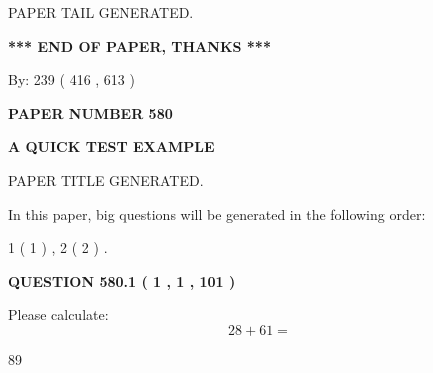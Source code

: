 \documentclass[12pt]{article}
\begin{document}
\vspace{2.0in} PAPER TAIL GENERATED.
   
   
   
   
\vspace{1.0in} 
{\textbf{\large{ *** END OF PAPER, THANKS *** }}} 
   
   
\hspace{1.0in} By: 
 239 ( 416 ,  613 )
   
   
   
   
\newpage 
\setcounter{page}{ 
   580001 } 
   
   
   
   
 {\textbf{ \Large{ PAPER NUMBER  580  }}}
   
   
\vspace{0.2in}
   
   
   
   
   
   
   
   
 \vspace{0.2in}
{\LARGE {\textbf{ A QUICK TEST EXAMPLE}}}
   
   
 PAPER TITLE GENERATED.
   
   
   
\vspace{0.2in}
   
In this paper, big questions will be generated in the following order: 
   
   
   1 ( 1 )
 ,
   2 ( 2 )
 .
  
\vspace{0.2in}
  
{\textbf{\Large{QUESTION
580.1 
 ( 1 , 1 , 101 )
}}}
  
  
 
Please calculate:
\begin{equation}
28 +  %
61 = \nonumber
\end{equation}
 
 
 
\noindent{}
 
 

89
 
 
\noindent{}
 
 

 
 
\end{document}
